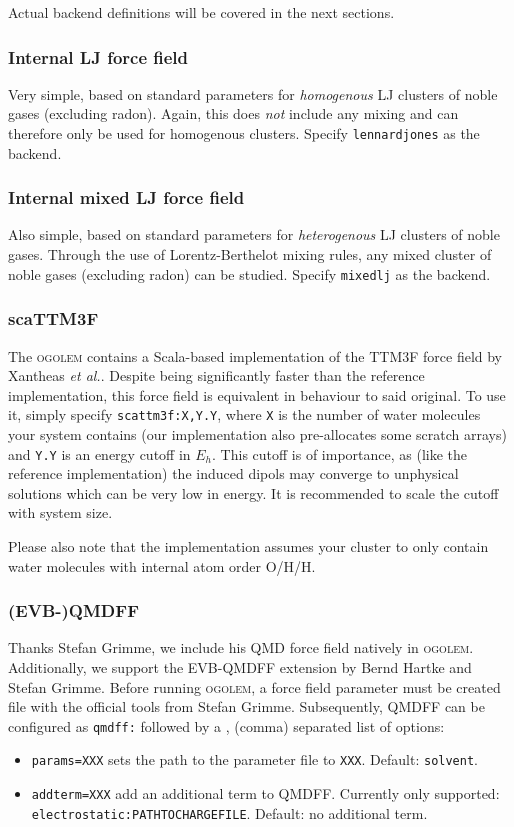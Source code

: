 \documentclass[a4paper,10pt]{scrbook}
\newcommand{\ogo}{\textsc{ogolem}}
\begin{document}
Actual backend definitions will be covered in the next sections.

\subsubsection{Internal LJ force field}
Very simple, based on standard parameters for \emph{homogenous} LJ clusters of
noble gases (excluding radon). Again, this does \emph{not} include any mixing 
and can therefore only be used for
homogenous clusters. Specify \texttt{lennardjones} as the backend.

\subsubsection{Internal mixed LJ force field}
Also simple, based on standard parameters for \emph{heterogenous} LJ clusters of
noble gases. Through the
use of Lorentz-Berthelot mixing rules, any mixed cluster of noble gases
(excluding radon) can be studied. Specify \texttt{mixedlj} as the backend.

\subsubsection{scaTTM3F}
The \ogo{} contains a Scala-based implementation of the TTM3F force field by
Xantheas \emph{et al.}. Despite being significantly faster than the reference
implementation, this force field is equivalent in behaviour to said original. To
use it, simply specify \texttt{scattm3f:X,Y.Y}, where \texttt{X} is the number
of water molecules your system contains (our implementation also pre-allocates 
some
scratch arrays) and \texttt{Y.Y} is an energy cutoff in $E_h$. This cutoff is of
importance, as (like the reference implementation) the induced dipols may
converge to unphysical solutions which can be very low in energy. It is
recommended to scale the cutoff with system size.

Please also note that the implementation assumes your cluster to only contain
water molecules with internal atom order O/H/H.

\subsubsection{(EVB-)QMDFF}
Thanks Stefan Grimme, we include his QMD force field natively in \ogo{}. 
Additionally,
we support the EVB-QMDFF extension by Bernd Hartke and Stefan Grimme. Before 
running \ogo{}, a force field parameter must be created file with the 
official tools from Stefan Grimme. Subsequently, QMDFF can be configured as
\texttt{qmdff:} followed by a , (comma) separated list of options:
\begin{itemize}
 \item \texttt{params=XXX} sets the path to the parameter file to \texttt{XXX}. Default: \texttt{solvent}.
 \item \texttt{addterm=XXX} add an additional term to QMDFF. Currently only supported: \texttt{electrostatic:PATHTOCHARGEFILE}. Default: no additional term.
\end{itemize}
\end{document}
